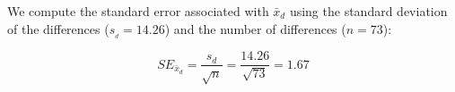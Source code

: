 


We compute the standard error associated with $\bar{x}_{d}$ using the standard deviation of the differences ($s_{_{d}}=14.26$) and the number of differences ($n=73$):

\begin{equation*}
SE_{\bar{x}_{d}} = \frac{s_{d}}{\sqrt{n}} = \frac{14.26}{\sqrt{73}} = 1.67
\end{equation*}


